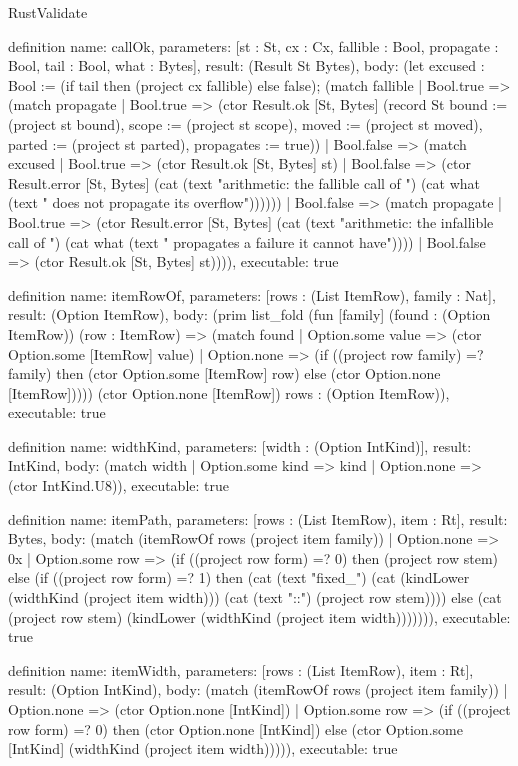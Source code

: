 \begin{lexlean}{RustValidate}
\begin{semanticmodule}
definition{
  name: callOk,
  parameters: [st : St, cx : Cx, fallible : Bool, propagate : Bool, tail : Bool, what : Bytes],
  result: (Result St Bytes),
  body: (let excused : Bool := (if tail then (project cx fallible) else false); (match fallible
    | Bool.true => (match propagate
      | Bool.true => (ctor Result.ok [St, Bytes] (record St {bound := (project st bound), scope := (project st scope), moved := (project st moved), parted := (project st parted), propagates := true}))
      | Bool.false => (match excused
        | Bool.true => (ctor Result.ok [St, Bytes] st)
        | Bool.false => (ctor Result.error [St, Bytes] (cat (text "arithmetic: the fallible call of ") (cat what (text " does not propagate its overflow"))))))
    | Bool.false => (match propagate
      | Bool.true => (ctor Result.error [St, Bytes] (cat (text "arithmetic: the infallible call of ") (cat what (text " propagates a failure it cannot have"))))
      | Bool.false => (ctor Result.ok [St, Bytes] st)))),
  executable: true
}

definition{
  name: itemRowOf,
  parameters: [rows : (List ItemRow), family : Nat],
  result: (Option ItemRow),
  body: (prim list_fold (fun [family] (found : (Option ItemRow)) (row : ItemRow) => (match found
    | Option.some value => (ctor Option.some [ItemRow] value)
    | Option.none => (if ((project row family) =? family) then (ctor Option.some [ItemRow] row) else (ctor Option.none [ItemRow])))) (ctor Option.none [ItemRow]) rows : (Option ItemRow)),
  executable: true
}

definition{
  name: widthKind,
  parameters: [width : (Option IntKind)],
  result: IntKind,
  body: (match width | Option.some kind => kind | Option.none => (ctor IntKind.U8)),
  executable: true
}

definition{
  name: itemPath,
  parameters: [rows : (List ItemRow), item : Rt],
  result: Bytes,
  body: (match (itemRowOf rows (project item family))
    | Option.none => 0x
    | Option.some row => (if ((project row form) =? 0) then (project row stem) else (if ((project row form) =? 1) then (cat (text "fixed_") (cat (kindLower (widthKind (project item width))) (cat (text "::") (project row stem)))) else (cat (project row stem) (kindLower (widthKind (project item width))))))),
  executable: true
}

definition{
  name: itemWidth,
  parameters: [rows : (List ItemRow), item : Rt],
  result: (Option IntKind),
  body: (match (itemRowOf rows (project item family))
    | Option.none => (ctor Option.none [IntKind])
    | Option.some row => (if ((project row form) =? 0) then (ctor Option.none [IntKind]) else (ctor Option.some [IntKind] (widthKind (project item width))))),
  executable: true
}


\end{semanticmodule}
\end{lexlean}
